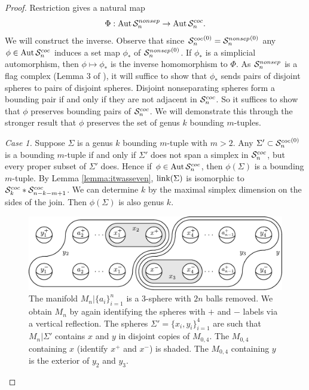 \begin{proof}
Restriction gives a natural map
$$\Phi: \operatorname{Aut}{{ \mathcal S^{{nonsep}}_n }} \to \operatorname{Aut}{{ \mathcal S^{{coc}}_{n} }}.$$
We will construct the inverse.
Observe that since ${{ \mathcal S^{{coc}}_{n} }}^{(0)} = {{ \mathcal S^{{nonsep}}_n }}^{(0)}$ any $\phi \in \operatorname{Aut}{{ \mathcal S^{{coc}}_{n} }}$ induces a set map $\phi_\ast$ of ${{ \mathcal S^{{nonsep}}_n }}^{(0)}$.
If $\phi_\ast$ is a simplicial automorphism, then $\phi \mapsto \phi_\ast$ is the inverse homomorphism to $\Phi$.
As ${ \mathcal S^{{nonsep}}_n }$ is a flag complex (Lemma 3 of \cite{souto}), it will suffice to show that $\phi_\ast$ sends pairs of disjoint spheres to pairs of disjoint spheres.
Disjoint nonseparating spheres form a bounding pair if and only if they are not adjacent in ${ \mathcal S^{{coc}}_{n} }$.
So it suffices to show that $\phi$ preserves bounding pairs of ${ \mathcal S^{{coc}}_{n} }$.
We will demonstrate this through the stronger result that $\phi$ preserves the set of genus $k$ bounding $m$-tuples.

\emph{Case 1.} Suppose $\Sigma$ is a genus $k$ bounding $m$-tuple with $m>2$. Any $\Sigma' \subset {{\ensuremath{ \mathcal S^{{coc}}_{n} }}}^{(0)}$ is a bounding $m$-tuple if and only if $\Sigma'$ does not span a simplex in ${ \mathcal S^{{coc}}_{n} }$, but every proper subset of $\Sigma'$ does. Hence if $\phi \in \operatorname{Aut}{{ \mathcal S^{{coc}}_{n} } }$, then $\phi(\Sigma)$ is a bounding $m$-tuple.
By Lemma \ref{lemma:itwasseven}, $\operatorname{link}(\Sigma)$ is isomorphic to ${ \mathcal S^{{coc}}_{k} } \ast {\ensuremath{ \mathcal S^{{coc}}_{n-k-m+1} }}$. We can determine $k$ by the maximal simplex dimension on the sides of the join. Then $\phi(\Sigma)$ is also genus $k$.

\begin{figure}[b!]
\includegraphics[width=\textwidth]{figures/spheresagain.pdf}
\caption{
The manifold $M_n|\{a_i\}_{i=1}^n$ is a 3-sphere with $2n$ balls removed.
We obtain $M_n$ by again identifying the spheres with $+$ and $-$ labels via a vertical reflection.
The spheres $\Sigma'=\{x_i,y_i\}_{i=1}^4$ are such that $M_n|\Sigma'$ contains $x$ and $y$ in disjoint copies of $M_{0,4}$. The $M_{0,4}$ containing $x$ (identify $x^+$ and $x^-$) is shaded. The $M_{0,4}$ containing $y$ is the exterior of $y_2$ and $y_3$.
}
\label{fig:spherediagram}
\end{figure}


\end{proof}
